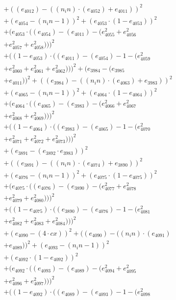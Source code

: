 \documentclass[10pt, a4paper]{article}
\begin{document}
\begin{small}
\begin{align*}
& + ((e_{4012}) - ((n_in)  \cdot  (e_{4052}) + e_{4011}))^{2} \\
& + (e_{4054} - (n_in - 1))^{2} + (e_{4053}  \cdot  (1 - e_{4053}))^{2} \\
& + (e_{4053}  \cdot  ((e_{4054}) - (e_{4011}) - (e_{4055}^{2} + e_{4056}^{2} \\
& + e_{4057}^{2} + e_{4058}^{2})))^{2} \\
& + ((1 - e_{4053})  \cdot  ((e_{4011}) - (e_{4054}) - 1 - (e_{4059}^{2} \\
& + e_{4060}^{2} + e_{4061}^{2} + e_{4062}^{2})))^{2} + (e_{3984} - (e_{3985} \\
& + e_{4011}))^{2} + ((e_{3984}) - ((n_in)  \cdot  (e_{4063}) + e_{3983}))^{2} \\
& + (e_{4065} - (n_in - 1))^{2} + (e_{4064}  \cdot  (1 - e_{4064}))^{2} \\
& + (e_{4064}  \cdot  ((e_{4065}) - (e_{3983}) - (e_{4066}^{2} + e_{4067}^{2} \\
& + e_{4068}^{2} + e_{4069}^{2})))^{2} \\
& + ((1 - e_{4064})  \cdot  ((e_{3983}) - (e_{4065}) - 1 - (e_{4070}^{2} \\
& + e_{4071}^{2} + e_{4072}^{2} + e_{4073}^{2})))^{2} \\
& + (e_{3891} - (e_{3892}  \cdot  e_{3983}))^{2} \\
& + ((e_{3891}) - ((n_in)  \cdot  (e_{4074}) + e_{3890}))^{2} \\
& + (e_{4076} - (n_in - 1))^{2} + (e_{4075}  \cdot  (1 - e_{4075}))^{2} \\
& + (e_{4075}  \cdot  ((e_{4076}) - (e_{3890}) - (e_{4077}^{2} + e_{4078}^{2} \\
& + e_{4079}^{2} + e_{4080}^{2})))^{2} \\
& + ((1 - e_{4075})  \cdot  ((e_{3890}) - (e_{4076}) - 1 - (e_{4081}^{2} \\
& + e_{4082}^{2} + e_{4083}^{2} + e_{4084}^{2})))^{2} \\
& + (e_{4090} - (4  \cdot  cx))^{2} + ((e_{4090}) - ((n_in)  \cdot  (e_{4091}) \\
& + e_{4089}))^{2} + (e_{4093} - (n_in - 1))^{2} \\
& + (e_{4092}  \cdot  (1 - e_{4092}))^{2} \\
& + (e_{4092}  \cdot  ((e_{4093}) - (e_{4089}) - (e_{4094}^{2} + e_{4095}^{2} \\
& + e_{4096}^{2} + e_{4097}^{2})))^{2} \\
& + ((1 - e_{4092})  \cdot  ((e_{4089}) - (e_{4093}) - 1 - (e_{4098}^{2} \\

\end{align*}
\end{small}
\end{document}
